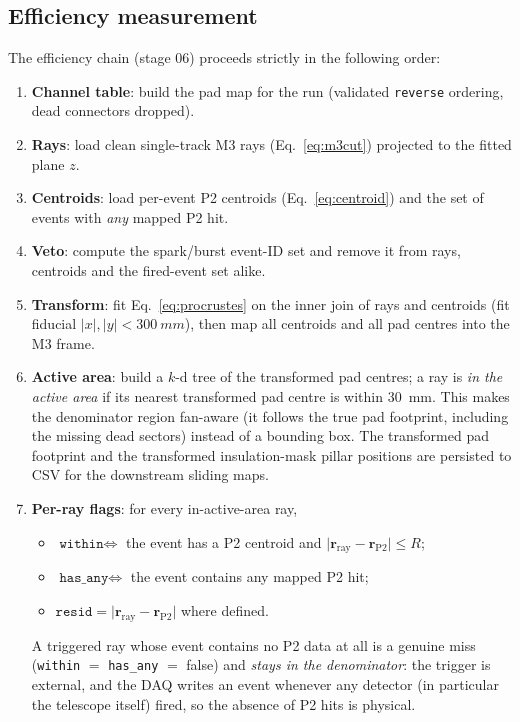 \documentclass[11pt,a4paper]{article}
\newcommand{\code}[1]{\texttt{#1}}
\begin{document}
\subsection{Efficiency measurement}
\label{sec:efficiency}

The efficiency chain (stage 06) proceeds strictly in the following order:

\begin{enumerate}[itemsep=2pt]
  \item \textbf{Channel table}: build the pad map for the run (validated
        \code{reverse} ordering, dead connectors dropped).
  \item \textbf{Rays}: load clean single-track M3 rays
        (Eq.~\eqref{eq:m3cut}) projected to the fitted plane $z$.
  \item \textbf{Centroids}: load per-event P2 centroids
        (Eq.~\eqref{eq:centroid}) and the set of events with \emph{any}
        mapped P2 hit.
  \item \textbf{Veto}: compute the spark/burst event-ID set and remove it
        from rays, centroids and the fired-event set alike.
  \item \textbf{Transform}: fit Eq.~\eqref{eq:procrustes} on the inner join
        of rays and centroids (fit fiducial $|x|,|y|<\SI{300}{mm}$), then map
        all centroids and all pad centres into the M3 frame.
  \item \textbf{Active area}: build a $k$-d tree of the transformed pad
        centres; a ray is \emph{in the active area} if its nearest
        transformed pad centre is within \SI{30}{mm}. This makes the
        denominator region fan-aware (it follows the true pad footprint,
        including the missing dead sectors) instead of a bounding box. The
        transformed pad footprint and the transformed insulation-mask pillar
        positions are persisted to CSV for the downstream sliding maps.
  \item \textbf{Per-ray flags}: for every in-active-area ray,
        \begin{itemize}
          \item $\code{within} \iff$ the event has a P2 centroid and
                $\lvert \mathbf{r}_\text{ray} - \mathbf{r}_\text{P2} \rvert
                 \le R$;
          \item $\code{has\_any} \iff$ the event contains any mapped P2 hit;
          \item $\code{resid} = \lvert \mathbf{r}_\text{ray} -
                \mathbf{r}_\text{P2}\rvert$ where defined.
        \end{itemize}
        A triggered ray whose event contains no P2 data at all is a genuine
        miss (\code{within} $=$ \code{has\_any} $=$ false) and \emph{stays in
        the denominator}: the trigger is external, and the DAQ writes an
        event whenever any detector (in particular the telescope itself)
        fired, so the absence of P2 hits is physical.
\end{enumerate}
\end{document}
